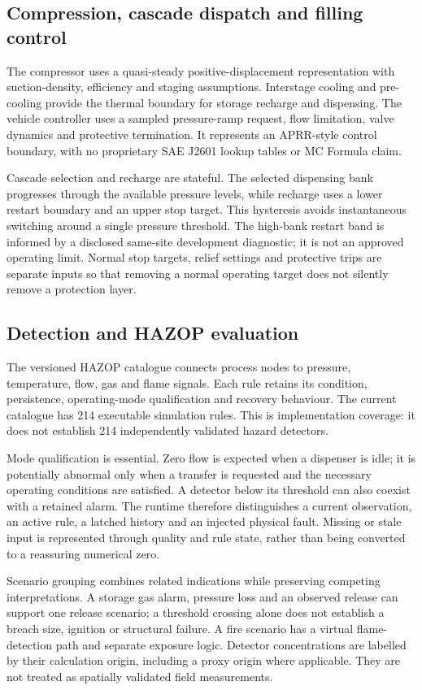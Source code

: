 \documentclass[12pt,a4paper]{article}
\begin{document}
\subsection{Compression, cascade dispatch and filling control}
The compressor uses a quasi-steady positive-displacement representation with
suction-density, efficiency and staging assumptions. Interstage cooling and
pre-cooling provide the thermal boundary for storage recharge and dispensing.
The vehicle controller uses a sampled pressure-ramp request, flow limitation,
valve dynamics and protective termination. It represents an APRR-style control
boundary, with no proprietary SAE J2601 lookup tables or MC Formula claim.

Cascade selection and recharge are stateful. The selected dispensing bank
progresses through the available pressure levels, while recharge uses a lower
restart boundary and an upper stop target. This hysteresis avoids instantaneous
switching around a single pressure threshold. The high-bank restart band is
informed by a disclosed same-site development diagnostic; it is not an approved
operating limit. Normal stop targets, relief settings and protective trips are
separate inputs so that removing a normal operating target does not silently
remove a protection layer.

\subsection{Detection and HAZOP evaluation}
The versioned HAZOP catalogue connects process nodes to pressure, temperature,
flow, gas and flame signals. Each rule retains its condition, persistence,
operating-mode qualification and recovery behaviour. The current catalogue has
214 executable simulation rules. This is implementation coverage: it does not
establish 214 independently validated hazard detectors.

Mode qualification is essential. Zero flow is expected when a dispenser is
idle; it is potentially abnormal only when a transfer is requested and the
necessary operating conditions are satisfied. A detector below its threshold
can also coexist with a retained alarm. The runtime therefore distinguishes a
current observation, an active rule, a latched history and an injected physical
fault. Missing or stale input is represented through quality and rule state,
rather than being converted to a reassuring numerical zero.

Scenario grouping combines related indications while preserving competing
interpretations. A storage gas alarm, pressure loss and an observed release can
support one release scenario; a threshold crossing alone does not establish a
breach size, ignition or structural failure. A fire scenario has a virtual
flame-detection path and separate exposure logic. Detector concentrations are
labelled by their calculation origin, including a proxy origin where applicable.
They are not treated as spatially validated field measurements.
\end{document}
